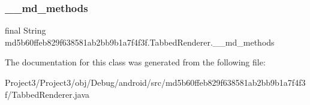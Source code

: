 \subsubsection{\texorpdfstring{\+\_\+\+\_\+md\+\_\+methods}{\_\_md\_methods}}
{\footnotesize\ttfamily final String md5b60ffeb829f638581ab2bb9b1a7f4f3f.\+Tabbed\+Renderer.\+\_\+\+\_\+md\+\_\+methods\hspace{0.3cm}{\ttfamily [static]}}



The documentation for this class was generated from the following file\+:\begin{DoxyCompactItemize}
\item 
Project3/\+Project3/obj/\+Debug/android/src/md5b60ffeb829f638581ab2bb9b1a7f4f3f/Tabbed\+Renderer.\+java\end{DoxyCompactItemize}
